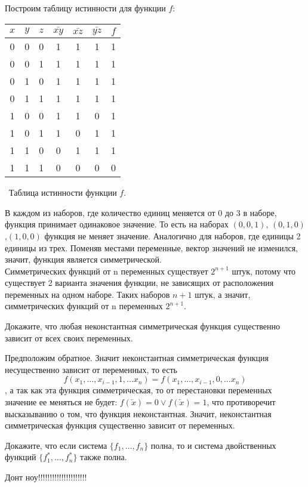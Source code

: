 \begin{solution}
Построим таблицу истинности для функции $f$:
\begin{center}
 \begin{tabular}{| c c c | c | c | c | c |}
  \hline	
 $x$ & $y$ & $z$ & $\bar{xy}$ & $\bar{xz}$ & $\bar{yz}$ & $f$ \T\B \\
  \hline\hline
  0 & 0 & 0 & 1 & 1 & 1 & 1 \T\B \\ 
  0 & 0 & 1 & 1 & 1 & 1 & 1 \B \\
  0 & 1 & 0 & 1 & 1 & 1 & 1 \B \\
  0 & 1 & 1 & 1 & 1 & 1 & 1 \B \\
  1 & 0 & 0 & 1 & 1 & 0 & 1 \B \\
  1 & 0 & 1 & 1 & 0 & 1 & 1\B \\
  1 & 1 & 0 & 0 & 1 & 1 & 1 \B \\
  1 & 1 & 1 & 0 & 0 & 0 & 0 \B \\
  \hline
 \end{tabular}
 \vspace{0,4 cm}
 
 \
 \small Таблица истинности функции $f$.
\end{center}

В каждом из наборов, где количество единиц меняется от 0 до 3 в наборе, функция принимает одинаковое значение. То есть на наборах $(0,0,1)$, $(0,1,0)$,$(1,0,0)$ функция не меняет значение. Аналогично для наборов, где единицы 2 единицы из трех. Поменяв местами переменные, вектор значений не изменился, значит, функция является симметрической.\\

Симметрических функций от n переменных существует $2^{n+1}$ штук, потому что существует 2 варианта значения функции, не зависящих от расположения переменных на одном наборе. Таких наборов $n+1$ штук, а значит, симметрических функций от n переменных $2^{n+1}$.
\end{solution}

\begin{exercise}
Докажите, что любая неконстантная симметрическая функция существенно зависит
от всех своих переменных.
\end{exercise}

\begin{solution}
Предположим обратное. Значит неконстантная симметрическая функция несущественно зависит от переменных, то есть
$$f(x_1,..., x_{i-1}, 1, ... x_n) = f(x_1,..., x_{i-1}, 0, ... x_n)$$, а так как эта функция симметрическая, то от перестановки переменных значение ее меняться не будет: $f(\overleftarrow{x})=0 \vee  f(\overleftarrow{x})=1$, что противоречит высказыванию о том, что функция неконстантная.  Значит, неконстантная симметрическая функция существенно зависит от переменных.
\end{solution}

\begin{exercise}
Докажите, что если система $\{f_1,\ldots,f_n\}$ полна, то и система
двойственных функций $\{f_1^*, \ldots, f_n^*\}$ также полна.
\end{exercise}

\begin{solution}
Донт ноу!!!!!!!!!!!!!!!!!!!!!
\end{solution}


